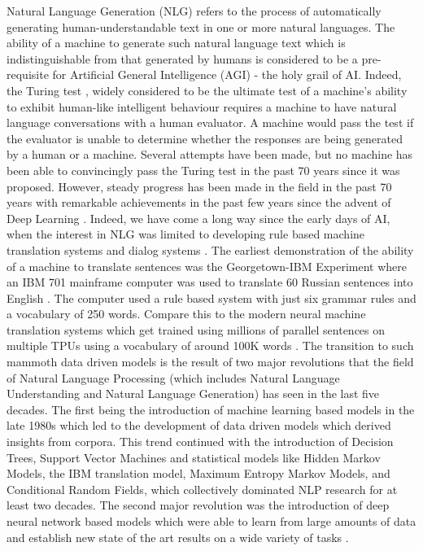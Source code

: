 

Natural Language Generation (NLG) refers to the process of automatically generating human-understandable text in one or more natural languages. The ability of a machine to generate such natural language text which is indistinguishable from that generated by humans is considered to be a pre-requisite for Artificial General Intelligence (AGI) - the holy grail of AI. Indeed, the Turing test , widely considered to be the ultimate test of a machine's ability to exhibit human-like intelligent behaviour requires a machine to have natural language conversations with a human evaluator. A machine would pass the test if the evaluator is unable to determine whether the responses are being generated by a human or a machine.
Several attempts have been made, but no machine has been able to convincingly pass the Turing test in the past 70 years since it was proposed. However, steady progress has been made in the field in the past 70 years with remarkable achievements in the past few years since the advent of Deep Learning . 
Indeed, we have come a long way since the early days of AI, when the interest in NLG was limited to developing rule based machine translation systems  and dialog systems .
The earliest demonstration of the ability of a machine to translate sentences was the Georgetown-IBM Experiment where an IBM 701 mainframe computer was used to translate 60 Russian sentences into English . The computer used a rule based system with just six grammar rules and a vocabulary of 250 words. Compare this to the modern neural machine translation systems which get trained using millions of parallel sentences on multiple TPUs using a vocabulary of around 100K words . 
The transition to such mammoth data driven models is the result of two major revolutions that the field of Natural Language Processing (which includes Natural Language Understanding and  Natural Language Generation) has seen in the last five decades. The first being the introduction of machine learning based models in the late 1980s which led to the development of data driven models which derived insights from corpora. This trend continued with the introduction of Decision Trees, Support Vector Machines and statistical models like Hidden Markov Models, the IBM translation model, Maximum Entropy Markov Models, and Conditional Random Fields, which collectively dominated NLP research for at least two decades. The second major revolution was the introduction of deep neural network based models which were able to learn from large amounts of data and establish new state of the art results on a wide variety of tasks . 
